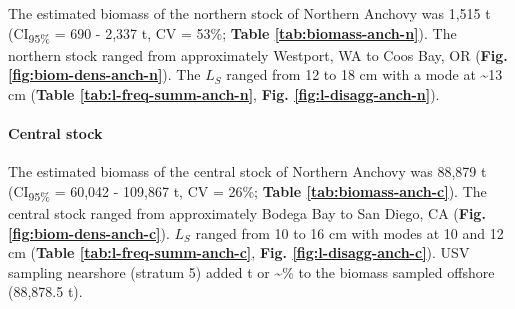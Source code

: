 \documentclass[]{article}
\let\oldparagraph\paragraph
\renewcommand{\paragraph}[1]{\oldparagraph{#1}\mbox{}}
\begin{document}
The estimated biomass of the northern stock of Northern Anchovy was 1,515 t (CI\textsubscript{95\%} = 690 - 2,337 t, CV = 53\%; \textbf{Table \ref{tab:biomass-anch-n}}). The northern stock ranged from approximately Westport, WA to Coos Bay, OR (\textbf{Fig. \ref{fig:biom-dens-anch-n}}). The \(L_S\) ranged from 12 to 18 cm with a mode at \textasciitilde13 cm (\textbf{Table \ref{tab:l-freq-summ-anch-n}}, \textbf{Fig. \ref{fig:l-disagg-anch-n}}).



\begin{table}[!h]

\caption{\label{tab:biomass-anch-n}Biomass estimates (metric tons, t) and their precision (upper and lower 95\% confidence intervals, CI\textsubscript{95\%}; standard deviation, SD; and coefficient of variation, CV) for the northern stock of Northern Anchovy (\emph{Engraulis mordax}). Stratum areas are nmi\textsuperscript{2}.}
\centering
{}
\end{table}

\hypertarget{results-anchovy-central}{%
\paragraph{Central stock}\label{results-anchovy-central}}

The estimated biomass of the central stock of Northern Anchovy was 88,879 t (CI\textsubscript{95\%} = 60,042 - 109,867 t, CV = 26\%; \textbf{Table \ref{tab:biomass-anch-c}}). The central stock ranged from approximately Bodega Bay to San Diego, CA (\textbf{Fig. \ref{fig:biom-dens-anch-c}}). \(L_S\) ranged from 10 to 16 cm with modes at 10 and 12 cm (\textbf{Table \ref{tab:l-freq-summ-anch-c}}, \textbf{Fig. \ref{fig:l-disagg-anch-c}}). USV sampling nearshore (stratum 5) added t or \textasciitilde\% to the biomass sampled offshore (88,878.5 t).
\end{document}
